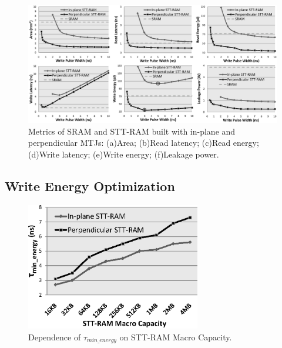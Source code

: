 \begin{figure}[t]
  \centering
  \includegraphics[width=7in]{fig/AllMetrics.eps}
  \caption{Metrics of SRAM and STT-RAM built with in-plane and perpendicular MTJs: (a)Area; (b)Read latency; (c)Read energy; (d)Write latency; (e)Write energy; (f)Leakage power.}
  \label{fig:metrics}
\end{figure}

\subsection{Write Energy Optimization}

\begin{figure}[t]
  \centering
  \includegraphics[width=3in]{fig/MinEnergy.eps}
  \caption{Dependence of $\tau_{min\_energy}$ on STT-RAM Macro Capacity.}
  \label{fig:minenergy}
\end{figure}

